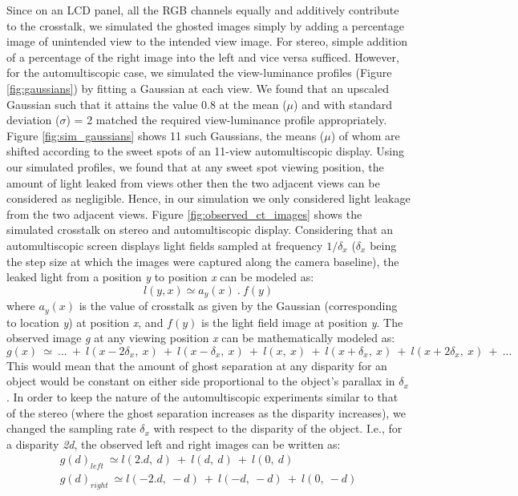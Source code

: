 Since on an LCD panel, all the RGB channels equally and additively contribute to the crosstalk, we simulated the ghosted images simply by adding a percentage image of unintended view to the intended view image. For stereo, simple addition of a percentage of the right image into the left and vice versa sufficed. However, for the automultiscopic case, we simulated the view-luminance profiles (Figure \ref{fig:gaussians}) by fitting a Gaussian at each view. We found that an upscaled Gaussian such that it attains the value 0.8 at the mean ($\mu$) and with standard deviation ($\sigma$) = 2 matched the required view-luminance profile appropriately. Figure \ref{fig:sim_gaussians} shows 11 such Gaussians, the means ($\mu$) of whom are shifted according to the sweet spots of an 11-view automultiscopic display. Using our simulated profiles, we found that at any sweet spot viewing position, the amount of light leaked from views other then the two adjacent views can be considered as negligible. Hence, in our simulation we only considered light leakage from the two adjacent views. Figure \ref{fig:observed_ct_images} shows the simulated crosstalk on stereo and automultiscopic display. Considering that an automultiscopic screen displays light fields sampled at frequency $1/\delta_x$ ($\delta_x$ being the step size at which the images were captured along the camera baseline), the leaked light from a position \emph{y} to position \emph{x} can be modeled as:
\begin{equation}
l(y,x) \simeq a_y(x)\:.\:f(y)
\label{eq:ct_leak_eq}
\end{equation}
where $a_y(x)$ is the value of crosstalk as given by the Gaussian (corresponding to location \emph{y}) at position \emph{x}, and $f(y)$ is the light field image at position \emph{y}. The observed image \emph{g} at any viewing position \emph{x} can be mathematically modeled as:
\begin{equation}
g(x) \: \simeq \: ...\: +\: l(x-2\delta_x,\:x)\:+\: l(x-\delta_x,\:x)\:+\:l(x,\:x)\:+\: l(x+\delta_x,\:x)\:+\: l(x+2\delta_x,\:x)\:+ \:...
\label{eq:ct_sim_eq}
\end{equation}
This would mean that the amount of ghost separation at any disparity for an object would be constant on either side proportional to the object's parallax in $\delta_x$. In order to keep the nature of the automultiscopic experiments similar to that of the stereo (where the ghost separation increases as the disparity increases), we changed the sampling rate $\delta_x$ with respect to the disparity of the object. I.e., for a disparity \emph{2d}, the observed left and right images can be written as:
\begin{equation}
\begin{aligned}
g(d)_{left} \: \simeq l(2.d,\:d)\:+\: l(d,\:d)\:+\:l(0,\:d) \\
g(d)_{right} \: \simeq l(-2.d,\:-d)\:+\: l(-d,\:-d)\:+\:l(0,\:-d)
\end{aligned}
\label{eq:auto_obs_imgs}
\end{equation}

